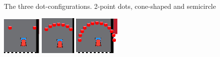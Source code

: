 \newpage
The three dot-configurations. 2-point dots, cone-shaped and semicircle
\begin{center}
\includegraphics[scale=1]{Billeder/2-punkt.PNG} 
\hspace{0.5mm}
\includegraphics[svale=0.6]{Billeder/Keglesnit.PNG}
\hspace{0.5mm}
\includegraphics[svale=0.6]{Billeder/Halvcirkel.PNG}
\end{center}

